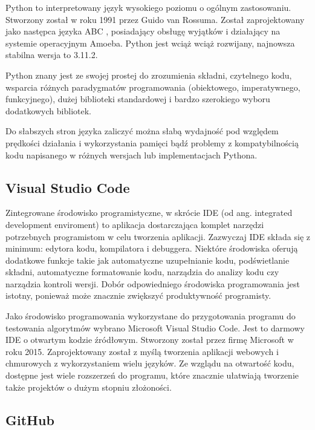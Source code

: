 \documentclass[12pt,twoside]{article}
\begin{document}
Python to interpretowany język wysokiego poziomu o ogólnym zastosowaniu.
Stworzony został w roku 1991 przez Guido van Rossuma.
Został zaprojektowany jako następca języka ABC \cite{abc}, posiadający obsługę wyjątków i działający na systemie operacyjnym Amoeba. \cite{python2}
Python jest wciąż wciąż rozwijany, najnowsza stabilna wersja to 3.11.2.

Python znany jest ze swojej prostej do zrozumienia składni,
czytelnego kodu, wsparcia różnych paradygmatów programowania (obiektowego, imperatywnego, funkcyjnego),
dużej biblioteki standardowej i bardzo szerokiego wyboru dodatkowych bibliotek. \cite{python3}

Do słabszych stron języka zaliczyć można słabą wydajność pod względem prędkości działania i wykorzystania pamięci
bądź problemy z kompatybilnością kodu napisanego w różnych wersjach lub implementacjach Pythona. \cite{python3}

\subsection{Visual Studio Code}

Zintegrowane środowisko programistyczne, w skrócie IDE (od ang. integrated development enviroment)
to aplikacja dostarczająca komplet narzędzi potrzebnych programistom w celu tworzenia aplikacji.
Zazwyczaj IDE składa się z minimum: edytora kodu, kompilatora i debuggera.
Niektóre środowiska oferują dodatkowe funkcje takie jak automatyczne uzupełnianie kodu, podświetlanie składni,
automatyczne formatowanie kodu, narządzia do analizy kodu czy narządzia kontroli wersji.
Dobór odpowiedniego środowiska programowania jest istotny, ponieważ może znacznie zwiększyć produktywność programisty. \cite{ide}

Jako środowisko programowania wykorzystane do przygotowania programu do testowania algorytmów
wybrano Microsoft Visual Studio Code. \cite{vsc}
Jest to darmowy IDE o otwartym kodzie źródłowym. Stworzony został przez firmę Microsoft w roku 2015.
Zaprojektowany został z myślą tworzenia aplikacji webowych i chmurowych z wykorzystaniem wielu języków.
Ze wzglądu na otwartość kodu, dostępne jest wiele rozszerzeń do programu,
które znacznie ułatwiają tworzenie także projektów o dużym stopniu złożoności. \cite{vsc2}

\subsection{GitHub}
\end{document}
